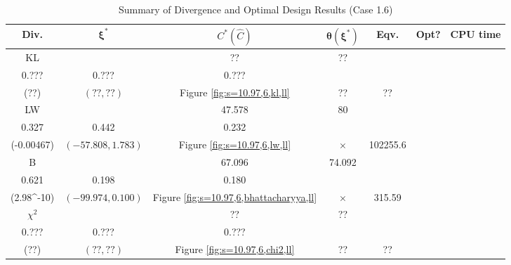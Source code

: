 \documentclass[12pt, a4paper]{article}
\begin{document}
\begin{table}[H]
\centering
\renewcommand{\arraystretch}{1.5} %
\setlength{\tabcolsep}{8pt} %
\begin{tabular}{|c|c|c|c|c|c|c|}
\hline
\textbf{Div.} & \(\boldsymbol{\xi^*}\) & \(C^* (\hat{C})\) & \(\boldsymbol{\hat{\theta}(\xi^*)}\) & \textbf{Eqv.} & \textbf{Opt?} & \textbf{CPU time} \\
\hline
KL & \(\left\{\begin{array}{ccc}
?? & ?? & ?? \\
0.??? & 0.??? & 0.???
\end{array}\right\}\) &
\(\begin{array}{c}
?? \\
(??)
\end{array}\) & 
\((??, ??)\) & 
Figure \ref{fig:s=10.97,6,kl,ll} & ?? & ?? \\
\hline
LW & \(\left\{\begin{array}{ccc}
10 & 47.578 & 80 \\
0.327 & 0.442 & 0.232
\end{array}\right\}\) &
\(\begin{array}{c}
0.000321 \\
(-0.00467)
\end{array}\) & 
\((-57.808, 1.783)\) & 
Figure \ref{fig:s=10.97,6,lw,ll} & $\times$ & 102255.6 \\
\hline
B & \(\left\{\begin{array}{ccc}
29.672 & 67.096 & 74.092 \\
0.621 & 0.198 & 0.180
\end{array}\right\}\) &
\(\begin{array}{c}
0 \\
(2.98\times 10^{-10})
\end{array}\) & 
\((-99.974, 0.100)\) & 
Figure \ref{fig:s=10.97,6,bhattacharyya,ll} & $\times$ & 315.59 \\
\hline
\(\chi^2\) & \(\left\{\begin{array}{ccc}
?? & ?? & ?? \\
0.??? & 0.??? & 0.???
\end{array}\right\}\) &
\(\begin{array}{c}
?? \\
(??)
\end{array}\) & 
\((??, ??)\) & 
Figure \ref{fig:s=10.97,6,chi2,ll} & ?? & ?? \\
\hline
\end{tabular}
\caption{Summary of Divergence and Optimal Design Results (Case 1.6)}
\label{tab:results1.6}
\end{table}
\end{document}
